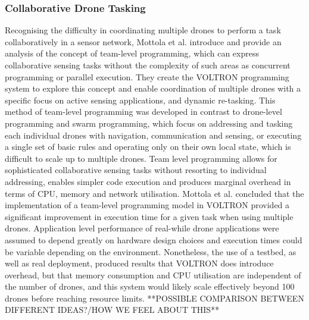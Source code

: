\subsubsection{Collaborative Drone Tasking}
Recognising the difficulty in coordinating multiple drones to perform a task collaboratively in a sensor network, Mottola et al. \cite{mottola2014} introduce and provide an analysis of the concept of team-level programming, which can express collaborative sensing tasks without the complexity of such areas as concurrent programming or parallel execution. They create the VOLTRON programming system to explore this concept and enable coordination of multiple drones with a specific focus on active sensing applications, and dynamic re-tasking.
This method of team-level programming was developed in contrast to drone-level programming and swarm programming, which focus on addressing and tasking each individual drones with navigation, communication and sensing, or executing a single set of basic rules and operating only on their own local state, which is difficult to scale up to multiple drones. Team level programming allows for sophisticated collaborative sensing tasks without resorting to individual addressing, enables simpler code execution and produces marginal overhead in terms of CPU, memory and network utilisation.
Mottola et al. concluded that the implementation of a team-level programming model in VOLTRON provided a significant improvement in execution time for a given task when using multiple drones. Application level performance of real-while drone applications were assumed to depend greatly on hardware design choices and execution times could be variable depending on the environment. Nonetheless, the use of a testbed, as well as real deployment, produced results that VOLTRON does introduce overhead, but that memory consumption and CPU utilisation are independent of the number of drones, and this system would likely scale effectively beyond 100 drones before reaching resource limits. 
**POSSIBLE COMPARISON BETWEEN DIFFERENT IDEAS?/HOW WE FEEL ABOUT THIS**

